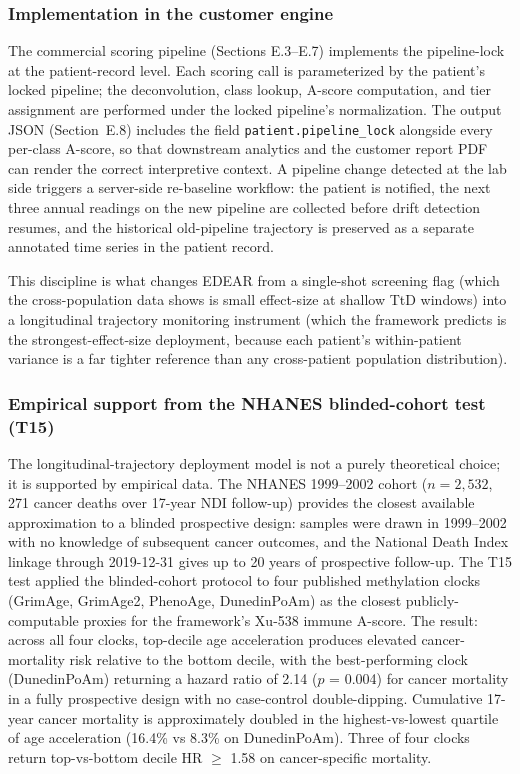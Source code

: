 \documentclass[12pt,a4paper]{article}
\begin{document}
\subsubsection{Implementation in the customer engine}

The commercial scoring pipeline (Sections E.3--E.7) implements the
pipeline-lock at the patient-record level. Each scoring call is
parameterized by the patient's locked pipeline; the deconvolution,
class lookup, A-score computation, and tier assignment are performed
under the locked pipeline's normalization. The output JSON
(Section~E.8) includes the field
\texttt{patient.pipeline\_lock} alongside every per-class A-score, so
that downstream analytics and the customer report PDF can render the
correct interpretive context. A pipeline change detected at the lab
side triggers a server-side re-baseline workflow: the patient is
notified, the next three annual readings on the new pipeline are
collected before drift detection resumes, and the historical
old-pipeline trajectory is preserved as a separate annotated time
series in the patient record.

This discipline is what changes EDEAR from a single-shot screening
flag (which the cross-population data shows is small effect-size at
shallow TtD windows) into a longitudinal trajectory monitoring
instrument (which the framework predicts is the
strongest-effect-size deployment, because each patient's within-patient
variance is a far tighter reference than any cross-patient population
distribution).

\subsubsection{Empirical support from the NHANES blinded-cohort test (T15)}

The longitudinal-trajectory deployment model is not a purely theoretical
choice; it is supported by empirical data. The NHANES 1999--2002 cohort
($n = 2{,}532$, 271 cancer deaths over 17-year NDI follow-up) provides the
closest available approximation to a blinded prospective design: samples
were drawn in 1999--2002 with no knowledge of subsequent cancer outcomes,
and the National Death Index linkage through 2019-12-31 gives up to 20
years of prospective follow-up. The T15 test applied the blinded-cohort
protocol to four published methylation clocks (GrimAge, GrimAge2,
PhenoAge, DunedinPoAm) as the closest publicly-computable proxies for the
framework's Xu-538 immune A-score. The result: across all four clocks,
top-decile age acceleration produces elevated cancer-mortality risk
relative to the bottom decile, with the best-performing clock
(DunedinPoAm) returning a hazard ratio of 2.14 ($p$ = 0.004) for cancer
mortality in a fully prospective design with no case-control
double-dipping. Cumulative 17-year cancer mortality is approximately
doubled in the highest-vs-lowest quartile of age acceleration (16.4\%
vs 8.3\% on DunedinPoAm). Three of four clocks return top-vs-bottom
decile HR $\geq$ 1.58 on cancer-specific mortality.
\end{document}
